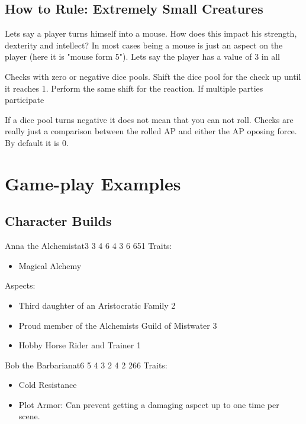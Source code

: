 \documentclass[11pt]{article}
\begin{document}
{\subsection{How to Rule: Extremely Small Creatures}
\label{sec:org57b2ea7}
Lets say a player turns himself into a mouse. How does this impact his strength, dexterity and intellect? In most cases being a mouse is just an aspect on the player (here it is "mouse form 5"). Lets say the player has a value of 3 in all 

Checks with zero or negative dice pools. Shift the dice pool for the check up until it reaches 1. Perform the same shift for the reaction. If multiple parties participate 

If a dice pool turns negative it does not mean that you can not roll. Checks are really just a comparison between the rolled AP and either the AP oposing force. By default it is 0.  


\section{Game-play Examples}
\label{sec:org08e5cb6}
\subsection{Character Builds}
\label{sec:org5753738}

\begin{npc}{Anna the Alchemist}{at}{3 3 4 6 4 3 6 6}{51}
Traits:
\begin{itemize}
\item Magical Alchemy
\end{itemize}
\columnbreak
Aspects:
\begin{itemize}
\item Third daughter of an Aristocratic Family 2
\item Proud member of the Alchemists Guild of Mistwater 3
\item Hobby Horse Rider and Trainer 1
\end{itemize}
\end{npc}

\begin{npc}{Bob the Barbarian}{at}{6 5 4 3 2 4 2 2}{66}
Traits:
\begin{itemize}
\item Cold Resistance
\item Plot Armor: Can prevent getting a damaging aspect up to one time per scene.
\end{itemize}
\columnbreak


\end{npc}}
\end{document}
